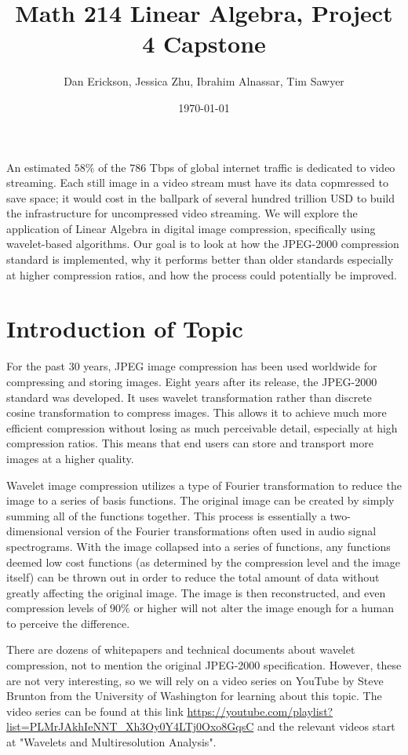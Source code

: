 \documentclass[12pt]{article}
\title{ Math 214 Linear Algebra, Project 4 Capstone }
\date{\today}
\author{Dan Erickson, Jessica Zhu, Ibrahim Alnassar, Tim Sawyer}
\begin{document}
\maketitle

An estimated $ 58\% $ of the $786$ Tbps of global internet traffic is dedicated to video streaming. Each still image in a video stream must have its data copmressed to save space; it would cost in the ballpark of several hundred trillion USD to build the infrastructure for uncompressed video streaming. We will explore the application of Linear Algebra in digital image compression, specifically using wavelet-based algorithms. Our goal is to look at how the JPEG-2000 compression standard is implemented, why it performs better than older standards especially at higher compression ratios, and how the process could potentially be improved.

\section{Introduction of Topic}

For the past 30 years, JPEG image compression has been used worldwide for compressing and storing images. Eight years after its release, the JPEG-2000 standard was developed. It uses wavelet transformation rather than discrete cosine transformation to compress images. This allows it to achieve much more efficient compression without losing as much perceivable detail, especially at high compression ratios. This means that end users can store and transport more images at a higher quality.

Wavelet image compression utilizes a type of Fourier transformation to reduce the image to a series of basis functions. The original image can be created by simply summing all of the functions together. This process is essentially a two-dimensional version of the Fourier transformations often used in audio signal spectrograms. With the image collapsed into a series of functions, any functions deemed low cost functions (as determined by the compression level and the image itself) can be thrown out in order to reduce the total amount of data without greatly affecting the original image. The image is then reconstructed, and even compression levels of $ 90\% $ or higher will not alter the image enough for a human to perceive the difference.

There are dozens of whitepapers and technical documents about wavelet compression, not to mention the original JPEG-2000 specification. However, these are not very interesting, so we will rely on a video series on YouTube by Steve Brunton from the University of Washington for learning about this topic. The video series can be found at this link \url{https://youtube.com/playlist?list=PLMrJAkhIeNNT_Xh3Oy0Y4LTj0Oxo8GqsC} and the relevant videos start at "Wavelets and Multiresolution Analysis".
\end{document}
